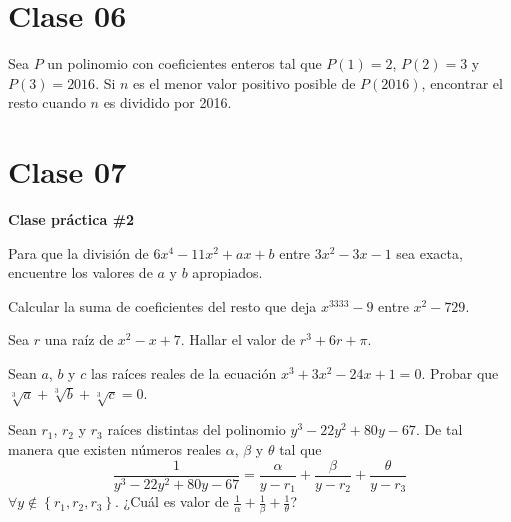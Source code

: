 \section{Clase 06}
    
    \begin{problem}
        Sea $P$ un polinomio con coeficientes enteros tal que $P(1) = 2$, $P(2) = 3$ y $P(3) = 2016$.
        Si $n$ es el menor valor positivo posible de $P(2016)$, encontrar el resto cuando $n$ es dividido por 2016.
    \end{problem}


\section{Clase 07}
    
    \textbf{Clase práctica \#2}

    \begin{problem}
        Para que la división de $6x^4 - 11x^2 + ax + b$ entre $3x^2 - 3x - 1$ sea exacta, encuentre los valores de $a$ y $b$ apropiados.
    \end{problem}

    \begin{problem}
        Calcular la suma de coeficientes del resto que deja $x^{3333} - 9$ entre $x^2 - 729$.
    \end{problem}

    \begin{problem}
        Sea $r$ una raíz de $x^2 - x + 7$.
        Hallar el valor de $r^3 + 6r + \pi$.
    \end{problem}

    \begin{problem}
        Sean $a$, $b$ y $c$ las raíces reales de la ecuación $x^3 + 3x^2 - 24x + 1 = 0$.
        Probar que $\sqrt[3]{a} + \sqrt[3]{b} + \sqrt[3]{c} = 0$.
    \end{problem}

    \begin{problem}
        Sean $r_1$, $r_2$ y $r_3$ raíces distintas del polinomio $y^3 - 22 y^2 + 80 y - 67$.
        De tal manera que existen números reales $\alpha$, $\beta$ y $\theta$ tal que
        \[\frac{1}{y^3 - 22 y^2 + 80 y - 67} = \frac{\alpha}{y - r_1} + \frac{\beta}{y - r_2} + \frac{\theta}{y - r_3}\]
        $\forall y \notin \left\{ r_1, r_2, r_3 \right\}$.
        ¿Cuál es valor de $\frac{1}{\alpha} + \frac{1}{\beta} + \frac{1}{\theta}$?
    \end{problem}

